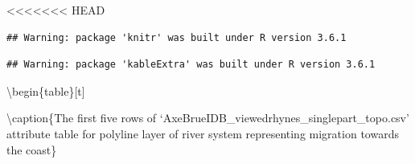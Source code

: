 \documentclass[]{article}
\begin{document}
\textless{}\textless{}\textless{}\textless{}\textless{}\textless{}\textless{}
HEAD

\begin{verbatim}
## Warning: package 'knitr' was built under R version 3.6.1
\end{verbatim}

\begin{verbatim}
## Warning: package 'kableExtra' was built under R version 3.6.1
\end{verbatim}

\textbackslash{}begin\{table\}{[}t{]}

\textbackslash{}caption\{\label{tab:unnamed-chunk-2}The first five rows
of `AxeBrueIDB\_viewedrhynes\_singlepart\_topo.csv' attribute table for
polyline layer of river system representing migration towards the
coast\} \centering
\end{document}
